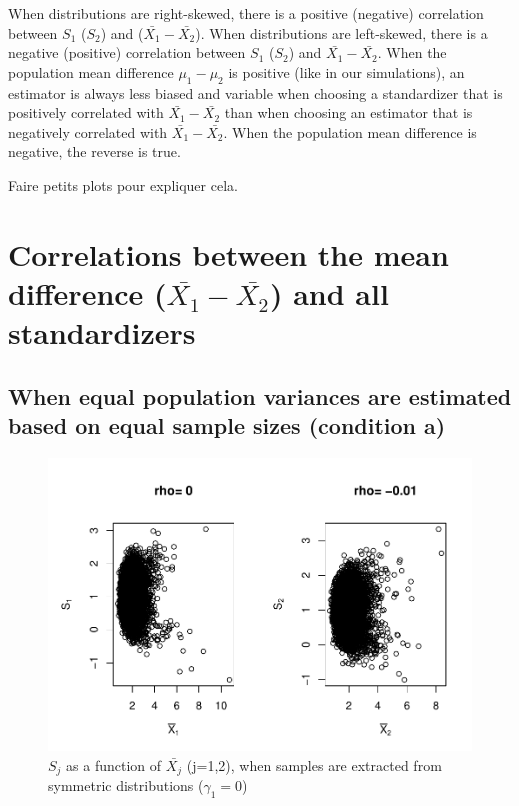 \documentclass[
  man]{apa6}
\begin{document}
When distributions are right-skewed, there is a positive (negative) correlation between \(S_1\) (\(S_2\)) and (\(\bar{X_1}-\bar{X_2}\)). When distributions are left-skewed, there is a negative (positive) correlation between \(S_1\) (\(S_2\)) and \(\bar{X_1}-\bar{X_2}\). When the population mean difference \(\mu_1-\mu_2\) is positive (like in our simulations), an estimator is always less biased and variable when choosing a standardizer that is positively correlated with \(\bar{X_1}-\bar{X_2}\) than when choosing an estimator that is negatively correlated with \(\bar{X_1}-\bar{X_2}\). When the population mean difference is negative, the reverse is true.

Faire petits plots pour expliquer cela.

\hypertarget{correlations-between-the-mean-difference-barx_1-barx_2-and-all-standardizers}{%
\section{\texorpdfstring{Correlations between the mean difference (\(\bar{X_1}-\bar{X_2}\)) and all standardizers}{Correlations between the mean difference (\textbackslash bar\{X\_1\}-\textbackslash bar\{X\_2\}) and all standardizers}}\label{correlations-between-the-mean-difference-barx_1-barx_2-and-all-standardizers}}

\hypertarget{when-equal-population-variances-are-estimated-based-on-equal-sample-sizes-condition-a}{%
\subsection{When equal population variances are estimated based on equal sample sizes (condition a)}\label{when-equal-population-variances-are-estimated-based-on-equal-sample-sizes-condition-a}}

\begin{figure}
\centering
\includegraphics{Correlations-between-the-sample-means-difference-and-standardizers-of-all-estimators,-and-implications-on-biases-and-variances-of-all-estimators_files/figure-latex/pltSDMEANHombalsym-1.pdf}
\caption{\label{fig:pltSDMEANHombalsym}\(S_j\) as a function of \(\bar{X_j}\) (j=1,2), when samples are extracted from symmetric distributions (\(\gamma_1 = 0\))}
\end{figure}
\end{document}
